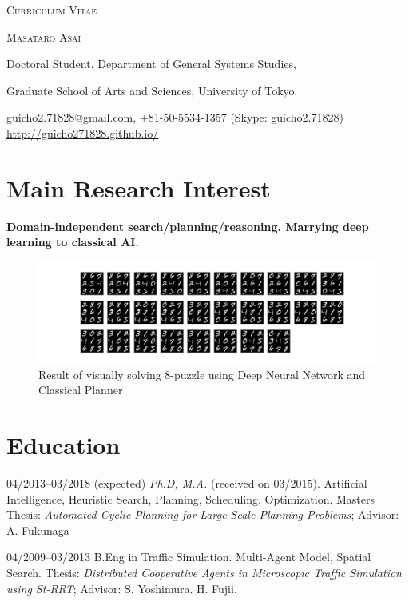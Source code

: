 \documentclass[letterpaper,12pt]{article}
\begin{document}
\pagestyle{empty}

\begin{center}
{\huge\textsc{Curriculum Vitae}}
\vspace{0.7\baselineskip}

{\Large\textsc{Masataro Asai}}
\vspace{0.5\baselineskip}

 {
Doctoral Student, Department of General Systems Studies,

Graduate School of Arts and Sciences, University of Tokyo.
}

\vspace{0.4\baselineskip}

 guicho2.71828@gmail.com, +81-50-5534-1357 (Skype: guicho2.71828)\\
 \url{http://guicho271828.github.io/}
\end{center}

\section{Main Research Interest}

\textbf{Domain-independent search/planning/reasoning. Marrying deep learning to classical AI.}

\begin{figure}[h]
 \centering
 \includegraphics[width=\textwidth]{img/static/blind.png}
 \caption{Result of visually solving 8-puzzle using Deep Neural Network and Classical Planner}
\end{figure}

\section{Education}

\begin{CV}
 \item[04/2013--03/2018] (expected) \textit{Ph.D, M.A.} (received on 03/2015).
 Artificial Intelligence, Heuristic Search, Planning, Scheduling, Optimization.
 {\small Masters Thesis: \emph{Automated Cyclic Planning for Large Scale Planning Problems}; Advisor: A. Fukunaga}

 \item[04/2009--03/2013] B.Eng in Traffic Simulation.
 Multi-Agent Model, Spatial Search.
 {\small Thesis: \emph{Distributed Cooperative Agents in Microscopic
 Traffic Simulation using St-RRT}; Advisor: S. Yoshimura. H. Fujii.}
\end{CV}
\end{document}
